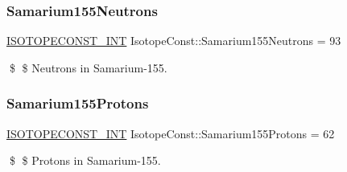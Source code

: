 \subsubsection{\texorpdfstring{Samarium155\+Neutrons}{Samarium155Neutrons}}
{\footnotesize\ttfamily \mbox{\hyperlink{group___isotope_const-_macros_ga5f18360b3e99483a35c32d789e62621c}{I\+S\+O\+T\+O\+P\+E\+C\+O\+N\+S\+T\+\_\+\+I\+NT}} Isotope\+Const\+::\+Samarium155\+Neutrons = 93}

\$ \$ Neutrons in Samarium-\/155. \mbox{\label{group___isotope_const-_samarium-_sm155_ga020aad036ec0c165b7150d89796c2896}} 
\subsubsection{\texorpdfstring{Samarium155\+Protons}{Samarium155Protons}}
{\footnotesize\ttfamily \mbox{\hyperlink{group___isotope_const-_macros_ga5f18360b3e99483a35c32d789e62621c}{I\+S\+O\+T\+O\+P\+E\+C\+O\+N\+S\+T\+\_\+\+I\+NT}} Isotope\+Const\+::\+Samarium155\+Protons = 62}

\$ \$ Protons in Samarium-\/155. 